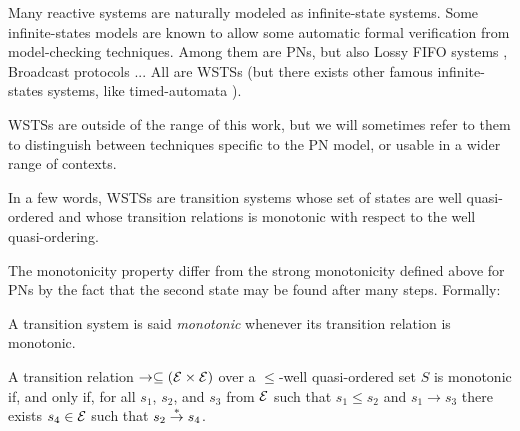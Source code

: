 Many reactive systems are naturally modeled as infinite-state systems.
Some infinite-states models are known to allow some automatic formal verification from model-checking techniques.
Among them are \acp{PN}, but also Lossy FIFO systems \citep{Abdulla98}, Broadcast protocols \citep{Emerson98}...
All are \acp{WSTS} (but there exists other famous infinite-states systems, like timed-automata \citep{Alur94}).

\acp{WSTS} are outside of the range of this work, but we will sometimes refer to them to distinguish between techniques specific to the \ac{PN} model, or usable in a wider range of contexts.

In a few words, \acp{WSTS} are transition systems whose set of states are well quasi-ordered and whose transition relations is monotonic with respect to the well quasi-ordering.

The monotonicity property differ from the strong monotonicity defined above for \acp{PN} by the fact that the second state may be found after many steps. Formally:
\begin{defi}[Monotonicity]
  A transition system is said \emph{monotonic} whenever  its transition relation is monotonic.

  A transition relation $\rightarrow \subseteq (\mathcal{E} \times \mathcal{E})$ over a $\leq$-well quasi-ordered set $S$ is monotonic if, and only if, for all $s_1$, $s_2$, and $s_3$ from $\mathcal{E}$ such that $s_1 \leq s_2$ and $s_1 \rightarrow s_3$ there exists $s_4 \in \mathcal{E}$ such that $s_2 \stackrel{*}{\to} s_4$.
\end{defi}
